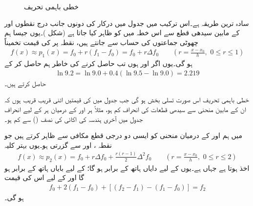 \begin{figure}
\centering
{}
\caption{خطی باہمی تحریف}
\label{شکل_اعدادی_خطی_باہمی_تحریف}
\end{figure}

سادہ ترین طریقہ  ہے۔اس ترکیب میں جدول میں درکار  کی دونوں جانب درج نقطوں  اور  کے مابین سیدھی قطع سے اس خطہ میں   کو ظاہر کیا جاتا ہے (شکل )۔یوں جیسا ہم چھوٹی جماعتوں کی حساب سے جانتے ہیں، نقطہ  پر  کی قیمت تخمیناً
\begin{align}\label{مساوات_اعدادی_خطی_باہمی_تحریف}
f(x)\approx p_1(x)=f_0+r(f_1-f_0)=f_0+r\Delta f_0\quad \quad (r=\frac{x-x_0}{h},\,\,0\le r\le 1)
\end{align}
ہو گی۔یوں اگر  اور  ہوں تب  حاصل کرنے کی خاطر ہم   حاصل کر کے
\begin{align*}
\ln 9.2=\ln 9.0+0.4(\ln 9.5-\ln 9.0)=2.219
\end{align*}
حاصل کرتے ہیں۔  

خطی باہمی تحریف اس صورت تسلی بخش ہو گی جب جدول میں  کی قیمتیں اتنی قریب قریب ہوں کہ ان کے مابین منحنی سے سیدھی قطعات کی انحراف کم ہو، مثلاً ہر   اور  کے درمیان ہر  کے لیے انحراف جدول میں آخری ہندسہ کی اکائی کی نصف () سے کم ہو۔

 میں ہم  اور  کے درمیان منحنی  کو ایسی دو درجی  قطع مکافی سے ظاہر کرتے ہیں جو نقطہ ،  اور  سے گزرتی ہو۔یوں بہتر کلیہ
\begin{align}\label{مساوات_اعدادی_دو_درجی_باہمی_تحریف}
f(x)\approx p_2(x)=f_0+r\Delta f_0+\frac{r(r-1)}{2}\Delta^2 f_0\quad \quad (r=\frac{x-x_0}{h},\,\, 0\le r\le 2)
\end{align} 
اخذ ہوتا ہے جہاں  ہے۔یوں  کے لیے دایاں ہاتھ  کے برابر ہو گا؛  کے لیے بایاں ہاتھ  کے برابر ہو گا اور  کے لیے اس کی قیمت
\begin{align*}
f_0+2(f_1-f_0)+[(f_2-f_1)-(f_1-f_0)]=f_2
\end{align*}
ہو گی۔

